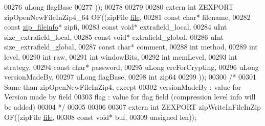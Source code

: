 \begin{DoxyCode}
00276                                             uLong flagBase
00277                                             ));
00278 
00279 
00280 \textcolor{keyword}{extern} \textcolor{keywordtype}{int} ZEXPORT zipOpenNewFileInZip4\_64 OF((zipFile \hyperlink{structfile}{file},
00281                                             \textcolor{keyword}{const} \textcolor{keywordtype}{char}* filename,
00282                                             \textcolor{keyword}{const} \hyperlink{structzip__fileinfo}{zip\_fileinfo}* zipfi,
00283                                             \textcolor{keyword}{const} \textcolor{keywordtype}{void}* extrafield\_local,
00284                                             uInt size\_extrafield\_local,
00285                                             \textcolor{keyword}{const} \textcolor{keywordtype}{void}* extrafield\_global,
00286                                             uInt size\_extrafield\_global,
00287                                             \textcolor{keyword}{const} \textcolor{keywordtype}{char}* comment,
00288                                             \textcolor{keywordtype}{int} method,
00289                                             \textcolor{keywordtype}{int} level,
00290                                             \textcolor{keywordtype}{int} raw,
00291                                             \textcolor{keywordtype}{int} windowBits,
00292                                             \textcolor{keywordtype}{int} memLevel,
00293                                             \textcolor{keywordtype}{int} strategy,
00294                                             \textcolor{keyword}{const} \textcolor{keywordtype}{char}* password,
00295                                             uLong crcForCrypting,
00296                                             uLong versionMadeBy,
00297                                             uLong flagBase,
00298                                             \textcolor{keywordtype}{int} zip64
00299                                             ));
00300 \textcolor{comment}{/*}
00301 \textcolor{comment}{  Same than zipOpenNewFileInZip4, except}
00302 \textcolor{comment}{    versionMadeBy : value for Version made by field}
00303 \textcolor{comment}{    flag : value for flag field (compression level info will be added)}
00304 \textcolor{comment}{ */}
00305 
00306 
00307 \textcolor{keyword}{extern} \textcolor{keywordtype}{int} ZEXPORT zipWriteInFileInZip OF((zipFile \hyperlink{structfile}{file},
00308                        \textcolor{keyword}{const} \textcolor{keywordtype}{void}* buf,
00309                        \textcolor{keywordtype}{unsigned} len));

\end{DoxyCode}

